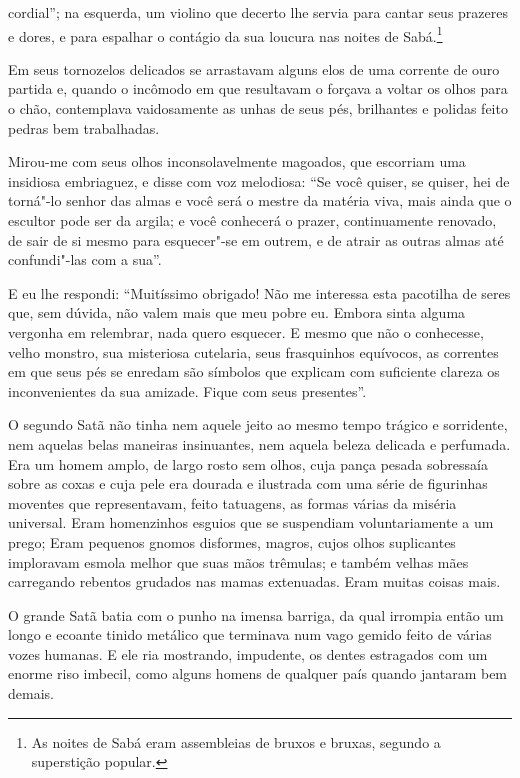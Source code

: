 \quebra

\noindent{}cordial''; na esquerda,
um violino que decerto lhe servia para cantar seus prazeres e
dores, e para espalhar o contágio da sua loucura nas noites de
Sabá.\protect\footnote{ As noites de Sabá eram assembleias de bruxos e bruxas, segundo a
superstição popular.}

Em seus tornozelos delicados se arrastavam alguns elos de uma corrente
de ouro partida e, quando o incômodo em que resultavam o forçava a
voltar os olhos para o chão, contemplava vaidosamente as unhas de
seus pés, brilhantes e polidas feito pedras bem trabalhadas.

Mirou-me com seus olhos inconsolavelmente magoados, que
escorriam uma insidiosa embriaguez, e disse com voz melodiosa:
“Se você quiser, se quiser, hei de torná"-lo senhor das
almas e você será o mestre da matéria viva, mais ainda que o
escultor pode ser da argila; e você conhecerá o prazer,
continuamente renovado, de sair de si mesmo para esquecer"-se em
outrem, e de atrair as outras almas até confundi"-las com a
sua”.

E eu lhe respondi: “Muitíssimo obrigado! Não me interessa
esta pacotilha de seres que, sem dúvida, não valem mais que meu
pobre eu. Embora sinta alguma vergonha em relembrar, nada quero
esquecer. E mesmo que não o conhecesse, velho monstro, sua misteriosa
cutelaria, seus frasquinhos equívocos, as correntes em que seus pés se
enredam são símbolos que explicam com suficiente clareza os
inconvenientes da sua amizade. Fique com seus presentes”.

O segundo Satã não tinha nem aquele jeito ao mesmo tempo trágico e
sorridente, nem aquelas belas maneiras insinuantes, nem aquela beleza
delicada e perfumada. Era um homem amplo, de largo rosto sem olhos,
cuja pança pesada sobressaía sobre as coxas e cuja pele era
dourada e ilustrada com uma série de figurinhas
moventes que representavam, feito tatuagens, as formas várias da miséria universal. Eram
homenzinhos esguios que se suspendiam voluntariamente a um prego; Eram
pequenos gnomos disformes, magros, cujos olhos suplicantes imploravam
esmola melhor que suas mãos trêmulas; e também velhas mães
carregando rebentos grudados nas mamas extenuadas. Eram muitas coisas
mais.

O grande Satã batia com o punho na imensa barriga, da qual irrompia
então um longo e ecoante tinido metálico que terminava num vago
gemido feito de várias vozes humanas. E ele ria mostrando,
impudente, os dentes estragados com um enorme riso imbecil, como
alguns homens de qualquer país quando jantaram bem demais.

